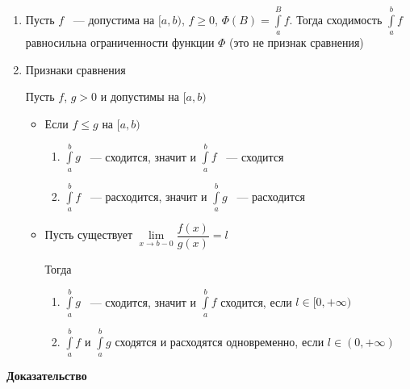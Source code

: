 \documentclass[../main.tex]{subfiles}
\begin{document}
            \begin{enumerate}
            
                \item Пусть $f$ ~--- допустима на $[a, b)$, $f \geq 0$, $\Phi(B) = \int\limits^B_a f$. Тогда сходимость $\int\limits^b_a f$ равносильна ограниченности функции $\Phi$ (это не признак сравнения)
                
                \item Признаки сравнения
                
                    Пусть $f$, $g > 0$ и допустимы на $[a, b)$
                    
                    \begin{itemize}
                    
                        \item
                        
                            Если $f \leq g$ на $[a, b)$
                            
                            \begin{enumerate}
                            
                                \item $\int\limits^b_a g$ ~--- сходится, значит и $\int\limits^b_a f$ ~--- сходится
                                
                                \item $\int\limits^b_a f$ ~--- расходится, значит и $\int\limits^b_a g$ ~--- расходится
                                
                            \end{enumerate}
                        
                        \item Пусть существует $\lim\limits_{x \rightarrow b - 0} \dfrac{f(x)}{g(x)} = l$
                        
                            Тогда
                            
                            \begin{enumerate}
                            
                                \item $\int\limits^b_a g$ ~--- сходится, значит и $\int\limits^b_a f$ сходится, если $l \in [0, +\infty)$
                                
                                \item $\int\limits^b_a f$ и $\int\limits^b_a g$ сходятся и расходятся одновременно, если $l \in (0, +\infty)$
                                
                            \end{enumerate}
                        
                    \end{itemize}
                
            \end{enumerate}
\newpage
\textbf{Доказательство}
        
\end{document}
